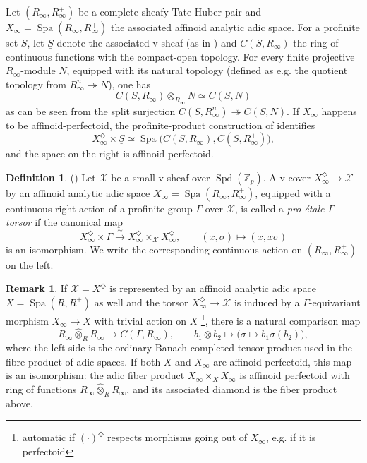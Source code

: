 \documentclass[10pt,twoside]{article}
\numberwithin{equation}{section}
\theoremstyle{plain}
\theoremstyle{definition}
\newtheorem{mydef}[mythm]{Definition}
\newtheorem{myrem}[mythm]{Remark}
\DeclareMathOperator{\Spa}{Spa}
\DeclareMathOperator{\Spd}{Spd}
\newcommand{\ZZ}{\mathbb{Z}}
\newcommand{\MCX}{\mathcal{X}}
\let \diamond \Diamond
\begin{document}
Let \((R_\infty,R_\infty^+)\) be a complete sheafy Tate Huber pair and \(X_\infty=\Spa(R_\infty,R_\infty^+)\) the associated affinoid analytic adic space. For a profinite set \(S\), let \(\underline S\) denote the associated v-sheaf (as in \cite[\S9.3]{SW20}) and \(C(S,R_\infty)\) the ring of continuous functions with the compact-open topology. For every finite projective \(R_\infty\)-module \(N\), equipped with its natural topology (defined as e.g. the quotient topology from \(R_\infty^n\twoheadrightarrow N\)), one has
\begin{equation*}
C(S,R_\infty)\otimes_{R_\infty} N\simeq C(S,N)
\end{equation*}
as can be seen from the split surjection \(C(S,R_\infty^n)\twoheadrightarrow C(S,N)\). If \(X_\infty\) happens to be affinoid-perfectoid, the profinite-product construction of \cite[\S9.3]{SW20} identifies
\[
X_\infty^\diamond\times\underline S
\simeq\Spa\bigl(C(S,R_\infty),C(S,R_\infty^+)\bigr),
\]
and the space on the right is affinoid perfectoid.

\begin{mydef}\label{proposalProetaleTorsor}(\cite[Definition 10.12 and Lemma 10.13]{etCohDiamonds})
Let \(\MCX\) be a small v-sheaf over \(\Spd(\ZZ_p)\). A v-cover \(X_\infty^\diamond\to\MCX\) by an affinoid analytic adic space \(X_\infty=\Spa(R_\infty,R_\infty^+)\), equipped with a continuous right action of a profinite group \(\Gamma\) over \(\MCX\), is called a \emph{pro-\'{e}tale \(\Gamma\)-torsor} if the canonical map
\begin{equation*}\tag{*}\label{proposalCechProduct}
X_\infty^\diamond\times\underline\Gamma
\xrightarrow{\ \sim\ }
X_\infty^\diamond\times_{\MCX}X_\infty^\diamond,
\qquad (x,\sigma)\longmapsto(x,x\sigma)
\end{equation*}
is an isomorphism. We write the corresponding continuous action on \((R_\infty,R_\infty^+)\) on the left.
\end{mydef}


\begin{myrem}\label{proposalTensorWarning}
If \(\MCX=X^\diamond\) is represented by an affinoid analytic adic space \(X=\Spa(R,R^+)\) as well and the torsor \(X_\infty^\diamond\to \MCX\) is induced by a \(\Gamma\)-equivariant morphism \(X_\infty\to X\) with trivial action on \(X\) \footnote{automatic if \((\cdot)^{\diamond}\) respects morphisms going out of \(X_\infty\), e.g. if it is perfectoid}, there is a natural comparison map
\[
R_\infty\widehat\otimes_R R_\infty\longrightarrow C(\Gamma,R_\infty),
\qquad b_1\otimes b_2\longmapsto
\bigl(\sigma\mapsto b_1\sigma(b_2)\bigr),
\]
where the left side is the ordinary Banach completed tensor product used in the fibre product of adic spaces. If both \(X\) and \(X_\infty\) are affinoid perfectoid, this map is an isomorphism: the adic fiber product \(X_\infty\times_X X_\infty\) is affinoid perfectoid with ring of functions \(R_\infty\widehat\otimes_R R_\infty\), and its associated diamond is the fiber product above.
\end{myrem}
\end{document}
